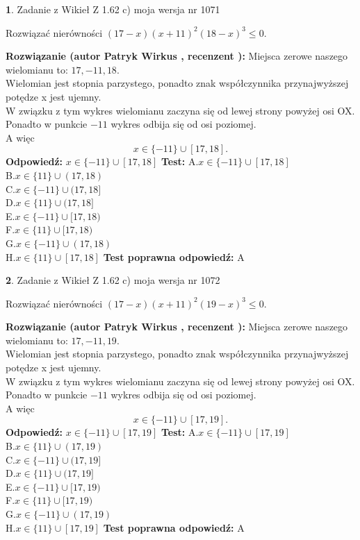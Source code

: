 \documentclass[12pt, a4paper]{article}
\theoremstyle{definition} %
\newtheorem{zad}{}
\newcommand{\zadStart}[1]{\begin{zad}#1\newline}
\newcommand{\zadStop}{\end{zad}}
\newcommand{\rozwStart}[2]{\noindent \textbf{Rozwiązanie (autor #1 , recenzent #2): }\newline}
\newcommand{\rozwStop}{\newline}
\newcommand{\odpStart}{\noindent \textbf{Odpowiedź:}\newline}
\newcommand{\odpStop}{\newline}
\newcommand{\testStart}{\noindent \textbf{Test:}\newline}
\newcommand{\testStop}{\newline}
\newcommand{\kluczStart}{\noindent \textbf{Test poprawna odpowiedź:}\newline}
\newcommand{\kluczStop}{\newline}
\begin{document}
\zadStart{Zadanie z Wikieł Z 1.62 c) moja wersja nr 1071}

Rozwiązać nierówności $(17-x)(x+11)^{2}(18-x)^{3}\le0$.
\zadStop
\rozwStart{Patryk Wirkus}{}
Miejsca zerowe naszego wielomianu to: $17, -11, 18$.\\
Wielomian jest stopnia parzystego, ponadto znak współczynnika przy\linebreak najwyższej potędze x jest ujemny.\\ W związku z tym wykres wielomianu zaczyna się od lewej strony powyżej osi OX.\\
Ponadto w punkcie $-11$ wykres odbija się od osi poziomej.\\
A więc $$x \in \{-11\} \cup [17,18].$$
\rozwStop
\odpStart
$x \in \{-11\} \cup [17,18]$
\odpStop
\testStart
A.$x \in \{-11\} \cup [17,18]$\\
B.$x \in \{11\} \cup (17,18)$\\
C.$x \in \{-11\} \cup (17,18]$\\
D.$x \in \{11\} \cup (17,18]$\\
E.$x \in \{-11\} \cup [17,18)$\\
F.$x \in \{11\} \cup [17,18)$\\
G.$x \in \{-11\} \cup (17,18)$\\
H.$x \in \{11\} \cup [17,18]$
\testStop
\kluczStart
A
\kluczStop



\zadStart{Zadanie z Wikieł Z 1.62 c) moja wersja nr 1072}

Rozwiązać nierówności $(17-x)(x+11)^{2}(19-x)^{3}\le0$.
\zadStop
\rozwStart{Patryk Wirkus}{}
Miejsca zerowe naszego wielomianu to: $17, -11, 19$.\\
Wielomian jest stopnia parzystego, ponadto znak współczynnika przy\linebreak najwyższej potędze x jest ujemny.\\ W związku z tym wykres wielomianu zaczyna się od lewej strony powyżej osi OX.\\
Ponadto w punkcie $-11$ wykres odbija się od osi poziomej.\\
A więc $$x \in \{-11\} \cup [17,19].$$
\rozwStop
\odpStart
$x \in \{-11\} \cup [17,19]$
\odpStop
\testStart
A.$x \in \{-11\} \cup [17,19]$\\
B.$x \in \{11\} \cup (17,19)$\\
C.$x \in \{-11\} \cup (17,19]$\\
D.$x \in \{11\} \cup (17,19]$\\
E.$x \in \{-11\} \cup [17,19)$\\
F.$x \in \{11\} \cup [17,19)$\\
G.$x \in \{-11\} \cup (17,19)$\\
H.$x \in \{11\} \cup [17,19]$
\testStop
\kluczStart
A
\kluczStop
\end{document}
